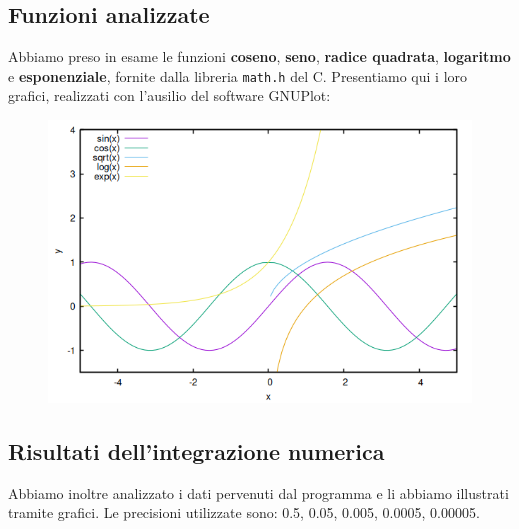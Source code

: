 \documentclass{article}
\begin{document}
\subsection{Funzioni analizzate}
Abbiamo preso in esame le funzioni \textbf{coseno}, \textbf{seno}, \textbf{radice quadrata}, \textbf{logaritmo} e \textbf{esponenziale}, fornite dalla libreria 
\texttt{math.h} del C. Presentiamo qui i loro grafici, realizzati con l'ausilio del software GNUPlot:
\begin{figure}[h]
   \centering
   \includegraphics*[scale=.5]{../grafici/immagini/funzioni.png}
\end{figure}

\subsection{Risultati dell'integrazione numerica}
Abbiamo inoltre analizzato i dati pervenuti dal programma e li abbiamo illustrati tramite grafici. Le precisioni utilizzate sono: 0.5, 0.05, 0.005, 0.0005, 0.00005.
\end{document}
